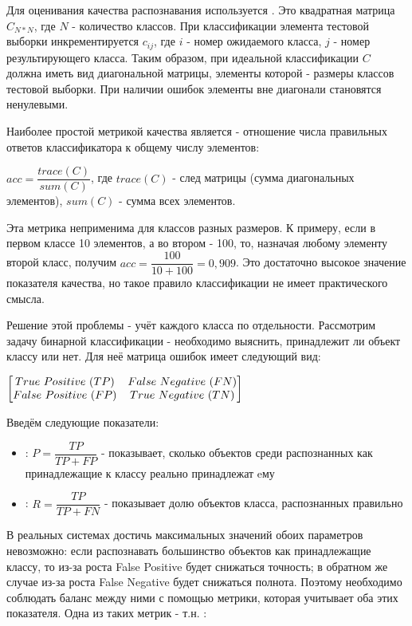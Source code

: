 Для оценивания качества распознавания используется . Это квадратная матрица $C_{N*N}$, где $N$ - количество классов. При классификации элемента тестовой выборки инкрементируется $c_{ij}$, где $i$ - номер ожидаемого класса, $j$ - номер результирующего класса. Таким образом, при идеальной классификации $C$ должна иметь вид диагональной матрицы, элементы которой - размеры классов тестовой выборки. При наличии ошибок элементы вне диагонали становятся ненулевыми.


Наиболее простой метрикой качества является  - отношение числа правильных ответов классификатора к общему числу элементов:

$acc=\dfrac{trace(C)}{sum(C)}$, где $trace(C)$ - след матрицы (сумма диагональных элементов), $sum(C)$ - сумма всех элементов.

Эта метрика неприменима для классов разных размеров. К примеру, если в первом классе 10 элементов, а во втором - 100, то, назначая любому элементу второй класс, получим $acc=\dfrac{100}{10+100}=0,909$. Это достаточно высокое значение показателя качества, но такое правило классификации не имеет практического смысла.

Решение этой проблемы - учёт каждого класса по отдельности. Рассмотрим задачу бинарной классификации - необходимо выяснить, принадлежит ли объект классу или нет. Для неё матрица ошибок имеет следующий вид:

$\begin{bmatrix} True~Positive~(TP)  & False~Negative~(FN) \\ False~Positive~(FP) & True~Negative~(TN) \\ \end{bmatrix}$

Введём следующие показатели:

\begin{itemize}
\item {}: $P=\dfrac{TP}{TP+FP}$ - показывает, сколько объектов среди распознанных как принадлежащие к классу реально принадлежат eму
\item {}: $R=\dfrac{TP}{TP+FN}$ - показывает долю объектов класса, распознанных правильно
\end{itemize}

В реальных системах достичь максимальных значений обоих параметров невозможно: если распознавать большинство объектов как принадлежащие классу, то из-за роста False Positive будет снижаться точность; в обратном же случае из-за роста False Negative будет снижаться полнота. Поэтому необходимо соблюдать баланс между ними с помощью метрики, которая учитывает оба этих показателя. Одна из таких метрик - т.н. :

